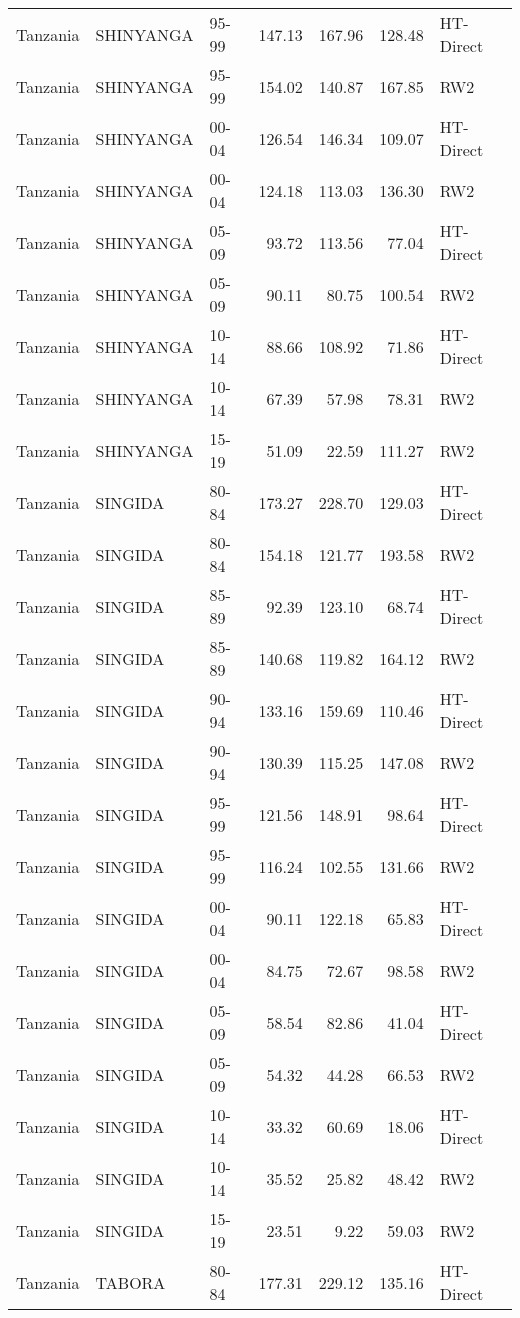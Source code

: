 \begin{longtable}{lllrrrl}
  Tanzania & SHINYANGA & 95-99 & 147.13 & 167.96 & 128.48 & HT-Direct \\ 
  Tanzania & SHINYANGA & 95-99 & 154.02 & 140.87 & 167.85 & RW2 \\ 
  Tanzania & SHINYANGA & 00-04 & 126.54 & 146.34 & 109.07 & HT-Direct \\ 
  Tanzania & SHINYANGA & 00-04 & 124.18 & 113.03 & 136.30 & RW2 \\ 
  Tanzania & SHINYANGA & 05-09 & 93.72 & 113.56 & 77.04 & HT-Direct \\ 
  Tanzania & SHINYANGA & 05-09 & 90.11 & 80.75 & 100.54 & RW2 \\ 
  Tanzania & SHINYANGA & 10-14 & 88.66 & 108.92 & 71.86 & HT-Direct \\ 
  Tanzania & SHINYANGA & 10-14 & 67.39 & 57.98 & 78.31 & RW2 \\ 
  Tanzania & SHINYANGA & 15-19 & 51.09 & 22.59 & 111.27 & RW2 \\ 
  Tanzania & SINGIDA & 80-84 & 173.27 & 228.70 & 129.03 & HT-Direct \\ 
  Tanzania & SINGIDA & 80-84 & 154.18 & 121.77 & 193.58 & RW2 \\ 
  Tanzania & SINGIDA & 85-89 & 92.39 & 123.10 & 68.74 & HT-Direct \\ 
  Tanzania & SINGIDA & 85-89 & 140.68 & 119.82 & 164.12 & RW2 \\ 
  Tanzania & SINGIDA & 90-94 & 133.16 & 159.69 & 110.46 & HT-Direct \\ 
  Tanzania & SINGIDA & 90-94 & 130.39 & 115.25 & 147.08 & RW2 \\ 
  Tanzania & SINGIDA & 95-99 & 121.56 & 148.91 & 98.64 & HT-Direct \\ 
  Tanzania & SINGIDA & 95-99 & 116.24 & 102.55 & 131.66 & RW2 \\ 
  Tanzania & SINGIDA & 00-04 & 90.11 & 122.18 & 65.83 & HT-Direct \\ 
  Tanzania & SINGIDA & 00-04 & 84.75 & 72.67 & 98.58 & RW2 \\ 
  Tanzania & SINGIDA & 05-09 & 58.54 & 82.86 & 41.04 & HT-Direct \\ 
  Tanzania & SINGIDA & 05-09 & 54.32 & 44.28 & 66.53 & RW2 \\ 
  Tanzania & SINGIDA & 10-14 & 33.32 & 60.69 & 18.06 & HT-Direct \\ 
  Tanzania & SINGIDA & 10-14 & 35.52 & 25.82 & 48.42 & RW2 \\ 
  Tanzania & SINGIDA & 15-19 & 23.51 & 9.22 & 59.03 & RW2 \\ 
  Tanzania & TABORA & 80-84 & 177.31 & 229.12 & 135.16 & HT-Direct \\ 

\end{longtable}
